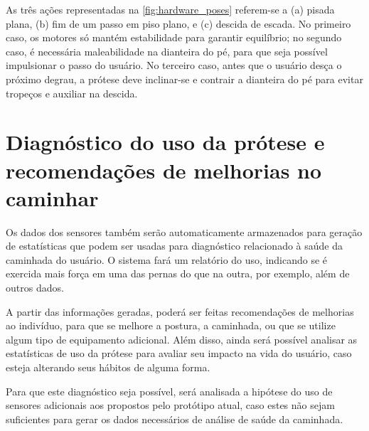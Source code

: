 As três ações representadas na \autoref{fig:hardware_poses} referem-se a (a) pisada plana, (b) fim de um passo em piso plano, e (c) descida de escada. No primeiro caso, os motores só mantém estabilidade para garantir equilíbrio; no segundo caso, é necessária maleabilidade na dianteira do pé, para que seja possível impulsionar o passo do usuário. No terceiro caso, antes que o usuário desça o próximo degrau, a prótese deve inclinar-se e contrair a dianteira do pé para evitar tropeços e auxiliar na descida.

\section{Diagnóstico do uso da prótese e recomendações de melhorias no caminhar}\label{sec:metodo_diagnostico}
Os dados dos sensores também serão automaticamente armazenados para geração de estatísticas que podem ser usadas para diagnóstico relacionado à saúde da caminhada do usuário. O sistema fará um relatório do uso, indicando se é exercida mais força em uma das pernas do que na outra, por exemplo, além de outros dados.

A partir das informações geradas, poderá ser feitas recomendações de melhorias ao indivíduo, para que se melhore a postura, a caminhada, ou que se utilize algum tipo de equipamento adicional. Além disso, ainda será possível analisar as estatísticas de uso da prótese para avaliar seu impacto na vida do usuário, caso esteja alterando seus hábitos de alguma forma.

Para que este diagnóstico seja possível, será analisada a hipótese do uso de sensores adicionais aos propostos pelo protótipo atual, caso estes não sejam suficientes para gerar os dados necessários de análise de saúde da caminhada.
